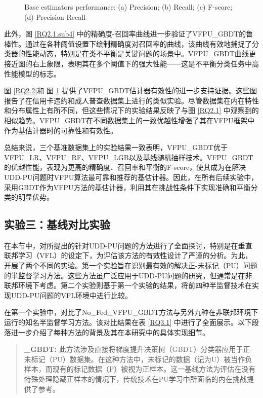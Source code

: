 \begin{figure}[H]
	{\centering \wuhao Base estimators performance: (a) Precision; (b) Recall; (c) F-score; (d) Precision-Recall}
	\label{RQ2.3}
\end{figure}
\vspace{-0.35cm}
此外，图 \ref{RQ2.1.sub4} 中的精确度-召回率曲线进一步验证了VFPU\_GBDT的鲁棒性。通过在各种阈值设置下绘制精确度对召回率的曲线，该曲线有效地捕捉了分类器的性能动态，特别是在类不平衡是关键问题的场景中。VFPU\_GBDT曲线更接近图的右上象限，表明其在多个阈值下的强大性能——这是不平衡分类任务中高性能模型的标志。

图 \ref{RQ2.2}和 图 \ref{RQ2.3} 提供了VFPU\_GBDT估计器有效性的进一步支持证据。这些图报告了在信用卡违约和成人普查数据集上进行的类似实验。尽管数据集在内在特性和分布属性上有所不同，但这些情况下的实验结果反映了与图 \ref{RQ2.1} 中观察到的相似趋势。VFPU\_GBDT在不同数据集上的一致优越性增强了其在VFPU框架中作为基估计器时的可靠性和有效性。

总结来说，三个基准数据集上的实验结果一致表明，VFPU\_GBDT优于VFPU\_LR、VFPU\_RF、VFPU\_LGB以及基线随机抽样技术。VFPU\_GBDT的优越性能，表现为更高的精确度、召回率和平衡的F-score，使其成为在解决UDD-PU问题时VFPU算法最可靠和推荐的基估计器。因此，在所有后续实验中，采用GBDT作为VFPU方法的基估计器，利用其在挑战性条件下实现准确和平衡分类的明显优势。

\subsection{实验三：基线对比实验}

在本节中，对所提出的针对UDD-PU问题的方法进行了全面探讨，特别是在垂直联邦学习（VFL）的设定下，为评估该方法的有效性设计了严谨的分析。为此，开展了两个不同的实验。第一个实验旨在识别最有效的解决正-未标记（PU）问题的半监督学习方法。这些方法虽广泛应用于UDD-PU问题的研究，但通常是在非联邦环境下考虑。第二个实验则基于第一个实验的结果，将前四种半监督技术在实现UDD-PU问题的VFL环境中进行比较。

在第一个实验中，对比了No\_Fed\_VFPU\_GBDT方法与另外九种在非联邦环境下运行的知名半监督学习方法。该对比结果在表 \ref{RQ3.1} 中进行了全面展示。以下段落进一步介绍了每种方法的背景及其在本研究中的具体实现细节。

\begin{quote}
	\textbf{\_GBDT:} 此方法涉及直接将梯度提升决策树（GBDT）分类器应用于正-未标记（PU）数据集。在这种方法中，未标记的数据（记为U）被当作负样本，而现有的标记数据（P）被视为正样本。这一基线方法为评估在没有特殊处理隐藏正样本的情况下，传统技术在PU学习中所面临的内在挑战提供了参考。
\end{quote}

